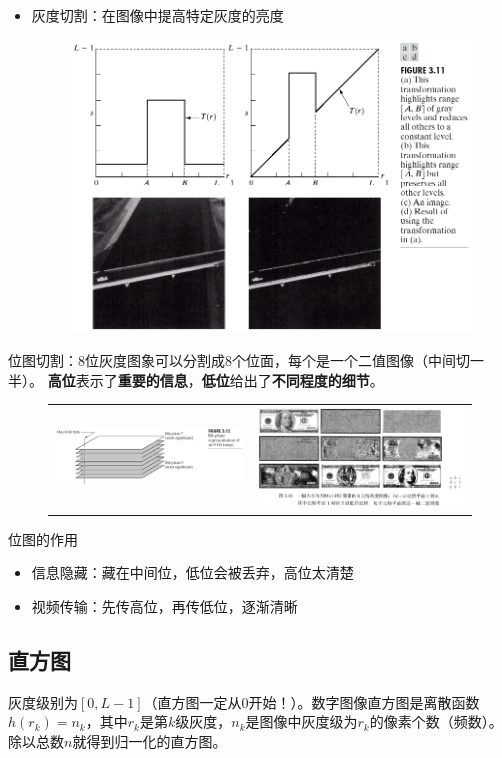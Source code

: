 \begin{itemize}
\begin{figure}[H]
\end{figure}
\item 灰度切割：在图像中提高特定灰度的亮度
\begin{figure}[H]
\centering
\includegraphics[width=0.6\linewidth]{fig/trans-cut.png}
\end{figure}
\end{itemize}

位图切割：8位灰度图象可以分割成8个位面，每个是一个二值图像（中间切一半）。
\textbf{高位}表示了\textbf{重要的信息}，\textbf{低位}给出了\textbf{不同程度的细节}。
\begin{figure}[H]
\centering
\begin{tabular}{cc}
\includegraphics[width=0.5\linewidth]{fig/bitmap.png}&
\includegraphics[width=0.5\linewidth]{fig/bitmap-dollars.png}
\end{tabular}
\end{figure}

位图的作用
\begin{itemize}
	\item 信息隐藏：藏在中间位，低位会被丢弃，高位太清楚
	\item 视频传输：先传高位，再传低位，逐渐清晰
\end{itemize}

\subsection{直方图}
\begin{definition}[直方图]
灰度级别为$[0,L-1]$（直方图一定从0开始！）。数字图像直方图是离散函数$h(r_k)=n_k$，其中$r_k$是第$k$级灰度，$n_k$是图像中灰度级为$r_k$的像素个数（频数）。
除以总数$n$就得到归一化的直方图。
\end{definition}

